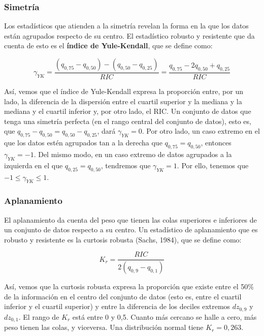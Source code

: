 \documentclass[12pt]{article}
\begin{document}
\subsubsection{Simetría}

Los estadísticos que atienden a la simetría revelan la forma en la que los datos están agrupados respecto de su centro. El estadístico robusto y resistente que da cuenta de esto es el \textbf{índice de Yule-Kendall}, que se define como:

\begin{equation}
\gamma_{YK} = \frac{(q_{0,75} - q_{0,50}) - (q_{0,50} - q_{0,25})}{RIC} = \frac{q_{0,75} - 2 q_{0,50} + q_{0,25}}{RIC}
\label{eq:yule-kendall}
\end{equation}

Así, vemos que el índice de Yule-Kendall expresa la proporción entre, por un lado, la diferencia de la dispersión entre el cuartil superior y la mediana y la mediana y el cuartil inferior y, por otro lado, el RIC. Un conjunto de datos que tenga una simetría perfecta (en el rango central del conjunto de datos), esto es, que $q_{0,75} - q_{0,50} = q_{0,50} - q_{0,25}$, dará $\gamma_{YK} = 0$. Por otro lado, un caso extremo en el que los datos estén agrupados tan a la derecha que $q_{0,75} = q_{0,50}$, entonces $\gamma_{YK} = -1$. Del mismo modo, en un caso extremo de datos agrupados a la izquierda en el que $q_{0,25} = q_{0,50}$, tendremos que $\gamma_{YK} = 1$. Por ello, tenemos que $-1 \leq \gamma_{YK} \leq 1$.

\subsubsection{Aplanamiento}

El aplanamiento da cuenta del peso que tienen las colas superiores e inferiores de un conjunto de datos respecto a su centro. Un estadístico de aplanamiento que es robusto y resistente es la curtosis robusta (Sachs, 1984), que se define como:

\begin{equation}
K_{r} = \frac{RIC}{2 (q_{0,9} - q_{0,1})}
\label{eq:robust-kurtosis}
\end{equation}

Así, vemos que la curtosis robusta expresa la proporción que existe entre el 50\% de la información en el centro del conjunto de datos (esto es, entre el cuartil inferior y el cuartil superior) y entre la diferencia de los deciles extremos $dz_{0,9}$ y $dz_{0,1}$. El rango de $K_{r}$ está entre 0 y 0,5. Cuanto más cercano se halle a cero, más peso tienen las colas, y viceversa. Una distribución normal tiene $K_{r} = 0,263$.
\end{document}

